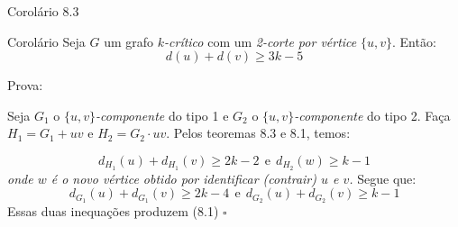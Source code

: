 \documentclass{beamer}
\begin{document}
\begin{frame}{Corolário 8.3}

    \begin{alertblock}{Corolário}
        Seja $G$ um grafo $k$\textit{-crítico} com um \textit{2-corte por vértice} $\{u,v\}$. Então: 
        \begin{equation}
            d(u) + d(v) \geq 3k - 5
        \end{equation}
    \end{alertblock}
    \vskip 0.3cm
    \begin{block}{Prova:}
        \begin{sloppypar}
            \justifying
            Seja $G_1$ o $\{u,v\}$\textit{-componente} do tipo 1 e $G_2$ o $\{u,v\}$\textit{-componente} do tipo 2. Faça $H_1 = G_1 + uv$ e $H_2 = G_2 \cdot uv$. Pelos teoremas 8.3 e 8.1, temos:
            \vskip 0.05cm
           
            \begin{equation*}
                d_{H_1}(u) + d_{H_1}(v) \geq 2k - 2\ \ \text{e} \ \ d_{H_2}(w) \geq k - 1
            \end{equation*}
            \textit{onde $w$ é o novo vértice obtido por identificar (contrair) $u$ e $v$.}
            \vskip 0.12cm
            Segue que:
            \begin{equation*}
                d_{G_1}(u) + d_{G_1}(v) \geq 2k - 4\ \ \text{e}\ \ 
                d_{G_2}(u) + d_{G_2}(v) \geq k-1
            \end{equation*}
            Essas duas inequações produzem (8.1)
            \hfill\(\square\)
        \end{sloppypar}
    \end{block}
        
\end{frame}
\end{document}
